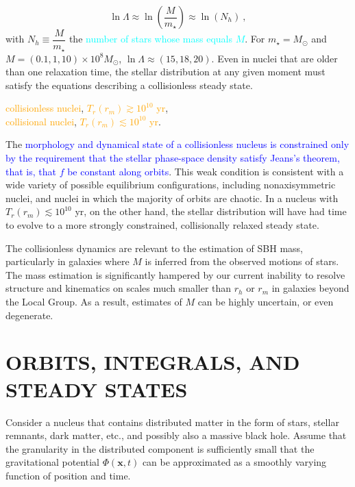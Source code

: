 \documentclass[12pt,a4paper]{article}
\renewcommand{\vec}[1]{\boldsymbol{#1}}
\newcounter{theo}[section]\setcounter{theo}{0}
\begin{document}
\begin{equation}
\ln \Lambda \approx \ln \left(\frac{M}{m_\star} \right) \approx \ln (N_h) ~,
\end{equation}
with $N_h \equiv \dfrac{M}{m_\star}$ the \textcolor{cyan}{number of stars whose mass equals $M$}. For $m_\star = M_\odot$ and $M = (0.1,1,10) \times 10^8 M_\odot$, $\ln \Lambda \approx (15, 18, 20)$. Even in nuclei that are older than one relaxation time, the stellar distribution at any given moment must satisfy the equations describing a collisionless steady state.

\textcolor{orange}{collisionless nuclei}, \textcolor{orange}{$T_r(r_m) \gtrsim 10^{10}$ yr}, \\
\textcolor{orange}{collisional nuclei}, \textcolor{orange}{$T_r(r_m) \lesssim 10^{10}$ yr}.

The \textcolor{blue}{morphology and dynamical state of a collisionless nucleus is constrained only by the requirement that the stellar phase-space density satisfy Jeans’s theorem, that is, that $f$ be constant along orbits}. This weak condition is consistent with a wide variety of possible equilibrium configurations, including nonaxisymmetric nuclei, and nuclei in which the majority of orbits are chaotic. In a nucleus with $T_r(r_m) \lesssim 10^{10}$ yr, on the other hand, the stellar distribution will have had time to evolve to a more strongly constrained, collisionally relaxed steady state.

The collisionless dynamics are relevant to the estimation of SBH mass, particularly in galaxies where $M$ is inferred from the observed motions of stars. The mass estimation is significantly hampered by our current inability to resolve structure and kinematics on scales much smaller than $r_h$ or $r_m$ in galaxies beyond the Local Group. As a result, estimates of $M$ can be highly uncertain, or even degenerate.


\section{ORBITS, INTEGRALS, AND STEADY STATES}
Consider a nucleus that contains distributed matter in the form of stars, stellar remnants, dark matter, etc., and possibly also a massive black hole. Assume that the granularity in the distributed component is sufficiently small that the gravitational potential $\Phi(\vec{x}, t)$ can be approximated as a smoothly varying function of position and time.
\end{document}
